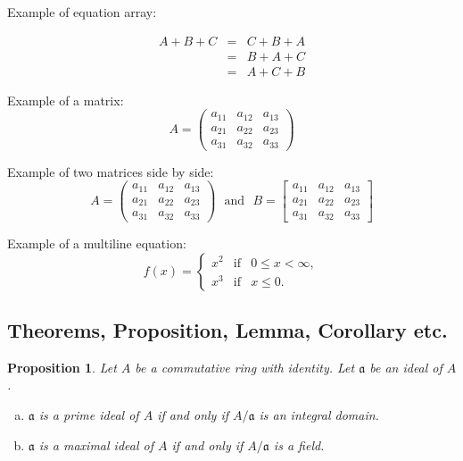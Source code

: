 \documentclass[11pt,leqno]{amsart}
\numberwithin{equation}{subsection}
\newtheorem{proposition}[equation]{Proposition}
\theoremstyle{definition}
\begin{document}
\noindent
Example of equation array: 

\begin{eqnarray}
A + B + C & = & C + B + A \nonumber \\ 
& = & B + A + C  \\ 
& = & A + C + B \nonumber
\end{eqnarray}

\noindent
Example of a matrix: 
\begin{equation}
A = \begin{pmatrix}
a_{11} & a_{12} & a_{13} \\ 
a_{21} & a_{22} & a_{23} \\ 
a_{31} & a_{32} & a_{33} 
\end{pmatrix} 
\end{equation}

\noindent
Example of two matrices side by side: 
\begin{equation}
A = \begin{pmatrix}
a_{11} & a_{12} & a_{13} \\ 
a_{21} & a_{22} & a_{23} \\ 
a_{31} & a_{32} & a_{33} 
\end{pmatrix} 
\ \ \ \text{and}\ \ \ 
B = \begin{bmatrix}
a_{11} & a_{12} & a_{13} \\ 
a_{21} & a_{22} & a_{23} \\ 
a_{31} & a_{32} & a_{33} 
\end{bmatrix}
\end{equation}

\noindent
Example of a multiline equation: 
\begin{equation}
f(x) = \left\{\begin{array}{rcl} %
x^2 & \mbox{if} & 0 \leq x < \infty, \\ 
x^3 & \mbox{if} & x \leq 0. 
\end{array}\right. 
\end{equation}


\subsection{Theorems, Proposition, Lemma, Corollary etc.}

\begin{proposition}\label{prop-1}
	Let $A$ be a commutative ring with identity. Let $\mathfrak a$ be an ideal of $A$. 
	\begin{enumerate}[(a)]
		\item $\mathfrak a$ is a prime ideal of $A$ if and only if $A/\mathfrak a$ is an integral domain. 
		\item $\mathfrak a$ is a maximal ideal of $A$ if and only if $A/\mathfrak a$ is a field. 
	\end{enumerate}
\end{proposition}
\end{document}
